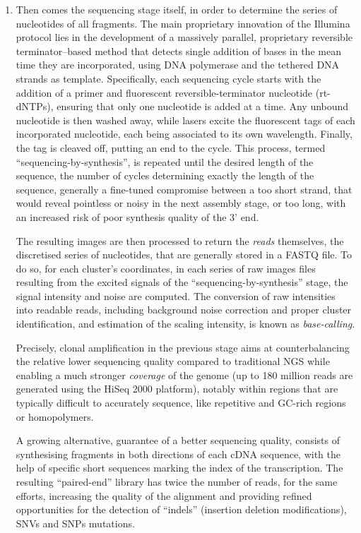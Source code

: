 \begin{enumerate}[label=(\roman*)]
    \item[Sequencing:] Then comes the sequencing stage itself, in order to determine the series of nucleotides of all fragments. The main proprietary innovation of the Illumina protocol lies in the development of a massively parallel, proprietary reversible terminator–based method that detects single addition of bases in the mean time they are incorporated, using DNA polymerase and the tethered DNA strands as template. Specifically, each sequencing cycle starts with the addition of a primer and fluorescent reversible-terminator nucleotide (rt-dNTPs), ensuring that only one nucleotide is added at a time. Any unbound nucleotide is then washed away, while lasers excite the fluorescent tags of each incorporated nucleotide, each being associated to its own wavelength. Finally, the tag is cleaved off, putting an end to the cycle. This process, termed \enquote{sequencing-by-synthesis}, is repeated until the desired length of the sequence, the number of cycles determining exactly the length of the sequence, generally a fine-tuned compromise between a too short strand, that would reveal pointless or noisy in the next assembly stage, or too long, with an increased risk of poor synthesis quality of the 3' end. 

    The resulting images are then processed to return the \textit{reads} themselves, the discretised series of nucleotides, that are generally stored in a FASTQ file. To do so, for each cluster's coordinates, in each series of raw images files resulting from the excited signals of the \enquote{sequencing-by-synthesis} stage, the signal intensity and noise are computed. The conversion of raw intensities into readable reads, including background noise correction and proper cluster identification, and estimation of the scaling intensity, is known as \textit{base-calling}.
    
    Precisely, clonal amplification in the previous stage aims at counterbalancing the relative lower sequencing quality compared to traditional NGS while enabling a much stronger \textit{coverage} of the genome (up to 180 million reads are generated using the HiSeq 2000 platform), notably within regions that are typically difficult to accurately sequence, like repetitive and GC-rich regions or homopolymers.
    
    A growing alternative, guarantee of a better sequencing quality, consists of synthesising fragments in both directions of each cDNA sequence, with the help of specific short sequences marking the index of the transcription. The resulting \enquote{paired-end} library has twice the number of reads, for the same efforts, increasing the quality of the alignment and providing refined opportunities for the detection of \enquote{indels} (insertion deletion modifications), SNVs and SNPs mutations.
    

\end{enumerate}
